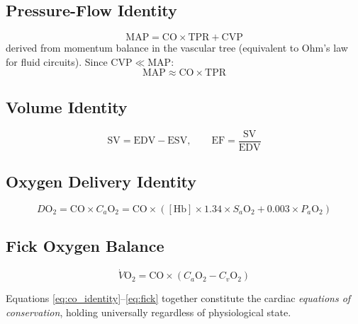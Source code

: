 \documentclass[10pt,twocolumn,a4paper]{article}
\theoremstyle{remark}
\newcommand{\CO}{\mathrm{CO}}
\newcommand{\SV}{\mathrm{SV}}
\newcommand{\MAP}{\mathrm{MAP}}
\newcommand{\TPR}{\mathrm{TPR}}
\newcommand{\CVP}{\mathrm{CVP}}
\newcommand{\EDV}{\mathrm{EDV}}
\newcommand{\ESV}{\mathrm{ESV}}
\newcommand{\EF}{\mathrm{EF}}
\begin{document}
\subsection{Pressure-Flow Identity}
\begin{equation}
    \boxed{\MAP = \CO \times \TPR + \CVP}
    \label{eq:pressure_flow}
\end{equation}
derived from momentum balance in the vascular tree (equivalent to Ohm's law for fluid circuits). Since $\CVP \ll \MAP$:
\begin{equation}
    \MAP \approx \CO \times \TPR
    \label{eq:pressure_flow_approx}
\end{equation}

\subsection{Volume Identity}
\begin{equation}
    \boxed{\SV = \EDV - \ESV, \qquad \EF = \frac{\SV}{\EDV}}
    \label{eq:volume_identity}
\end{equation}

\subsection{Oxygen Delivery Identity}
\begin{equation}
    \boxed{D\mathrm{O}_2 = \CO \times C_a\mathrm{O}_2 = \CO \times \left([\mathrm{Hb}] \times 1.34 \times S_a\mathrm{O}_2 + 0.003 \times P_a\mathrm{O}_2\right)}
    \label{eq:do2}
\end{equation}

\subsection{Fick Oxygen Balance}
\begin{equation}
    \boxed{\dot{V}\mathrm{O}_2 = \CO \times (C_a\mathrm{O}_2 - C_v\mathrm{O}_2)}
    \label{eq:fick}
\end{equation}

Equations \ref{eq:co_identity}--\ref{eq:fick} together constitute the cardiac \textit{equations of conservation}, holding universally regardless of physiological state.
\end{document}

